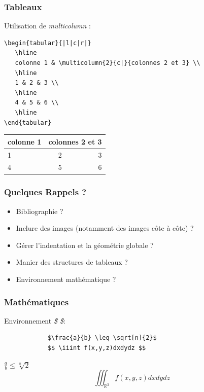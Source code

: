 \documentclass[handout]{beamer}
\begin{document}
\begin{frame}[fragile=singleslide]
	\frametitle{Tableaux}
	\centering
	Utilisation de \textit{multicolumn} :
	\begin{verbatim}
\begin{tabular}{|l|c|r|}
   \hline
   colonne 1 & \multicolumn{2}{c|}{colonnes 2 et 3} \\
   \hline
   1 & 2 & 3 \\
   \hline
   4 & 5 & 6 \\
   \hline
\end{tabular}
	\end{verbatim}

	\begin{tabular}{|l|c|r|}
	   \hline
	   colonne 1 & \multicolumn{2}{c|}{colonnes 2 et 3} \\
	   \hline
	   1 & 2 & 3 \\
	   \hline
	   4 & 5 & 6 \\
	   \hline
	\end{tabular}

\end{frame}

	\begin{frame}
		\frametitle{Quelques Rappels ?}
		\begin{itemize}
			\item Bibliographie ?
			\item Inclure des images (notamment des images côte à côte) ?
			\item Gérer l'indentation et la géométrie globale ?
			\item Manier des structures de tableaux ?
			\item Environnement mathématique ?
		\end{itemize}
	\end{frame}

	\begin{frame}[fragile=singleslide]
		\frametitle{Mathématiques}

		\centering
		Environnement \textit{\$ \$}:
		\begin{verbatim}
			$\frac{a}{b} \leq \sqrt[n]{2}$
			$$ \iiint f(x,y,z)dxdydz $$
		\end{verbatim}

		$\frac{a}{b} \leq \sqrt[n]{2}$
		$$ \iiint_{\mathbb{R}^3} f(x,y,z)dxdydz $$

	\end{frame}
\end{document}
